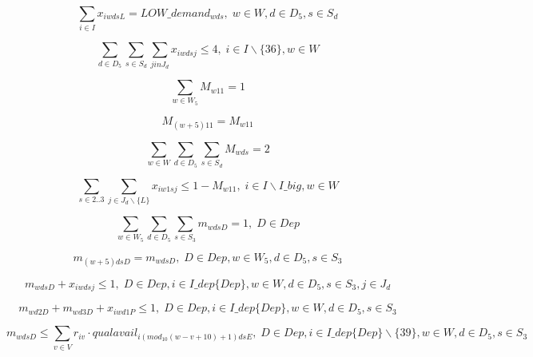 \begin{equation}
\sum_{i \in I} x_{iwdsL} = LOW\_demand_{wds}, \;   w\in W,d\in D_5,s\in S_d
\end{equation}

\begin{equation}
\sum_{d \in D_5}\sum_{s \in S_d}\sum_{j in J_d} x_{iwdsj} \leq 4, \;   i\in I\backslash\{36\},w\in W
\end{equation}

\begin{equation}
\sum_{w \in W_5} M_{w11} = 1
\end{equation}

\begin{equation}
M_{(w+5)11} = M_{w11}
\end{equation}

\begin{equation}
\sum_{w \in W}\sum_{d \in D_5}\sum_{s \in S_d} M_{wds} = 2
\end{equation}

\begin{equation}
\sum_{s \in 2..3}\sum_{j \in J_d\backslash\{L\}} x_{iw1sj} \leq 1-M_{w11}, \;   i \in I\backslash I\_big, w \in W
\end{equation}

\begin{equation}
\sum_{w \in W_5}\sum_{d \in D_5}\sum_{s \in S_3} m_{wdsD} = 1, \;   D \in Dep
\end{equation}

\begin{equation}
m_{(w+5)dsD} = m_{wdsD}, \;   D \in Dep, w \in W_5, d \in D_5, s \in S_3
\end{equation}

\begin{equation}
m_{wdsD} + x_{iwdsj} \leq 1, \;   D \in Dep, i \in I\_dep\{Dep\}, w \in W, d \in D_5, s \in S_3, j \in J_d
\end{equation}

\begin{equation}
m_{wd2D} + m_{wd3D} + x_{iwd1P} \leq 1, \;   D \in Dep, i \in I\_dep\{Dep\}, w \in W, d \in D_5, s \in S_3
\end{equation}

\begin{equation}
m_{wdsD} \leq \sum_{v \in V}r_{iv}\cdot qualavail_{i(mod_{10}(w-v+10)+1)dsE}, \;   D \in Dep, i \in I\_dep\{Dep\} \backslash \{39\}, w \in W, d \in D_5, s \in S_3
\end{equation}

